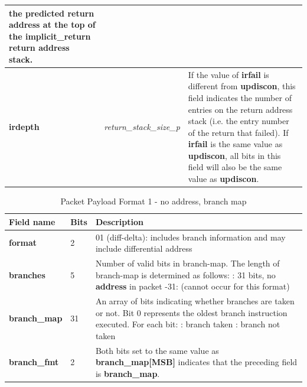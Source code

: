 \begin{table}[htp]
\begin{tabulary}{\textwidth}{|l|p{35mm}|p{80mm}|}
                the predicted return address at the top of the implicit\_return return address stack.\\
    \hline
    \textbf{irdepth}	& \textit {return\_stack\_size\_p} & 
                If the value of \textbf{irfail} is different from \textbf{updiscon}, this field indicates 
                the number of entries on the return address stack (i.e. the entry number of the return that
                failed).  If \textbf{irfail} is the same value as \textbf{updiscon}, all bits in this field 
                will also be the same value as \textbf{updiscon}. \\
    \hline
  \end{tabulary}
\end{table}

\begin{table}[htp]
  \centering
  \caption{Packet Payload Format 1  - no address, branch map}
  \label{tab:te_inst0-1-noaddr-map}
  \begin{tabulary}{\textwidth}{|l|p{35mm}|p{80mm}|}
    \hline
    {\bf Field name} & {\bf Bits} & {\bf Description} \\
    \hline
    \textbf{format}	& 2	& 01 (diff-delta): includes branch information and may include differential address\\
    \hline
    \textbf{branches} & 5 & Number of valid bits in branch-map. The length of branch-map is determined as follows: :      31 bits, no \textbf{address} in packet -31: 	(cannot occur for this format) \\
    \hline
    \textbf{branch\_map} & 31 & 
                 An array of bits indicating whether branches are taken or not.\newline
    Bit 0 represents the oldest branch instruction executed.   For each bit: : branch taken : branch not taken \\
    \hline
    \textbf{branch\_fmt} & 2  & Both bits set to the same value as \textbf{branch\_map[MSB]} indicates that the
    preceding field is \textbf{branch\_map}. \\
    \hline
  \end{tabulary}
\end{table}

